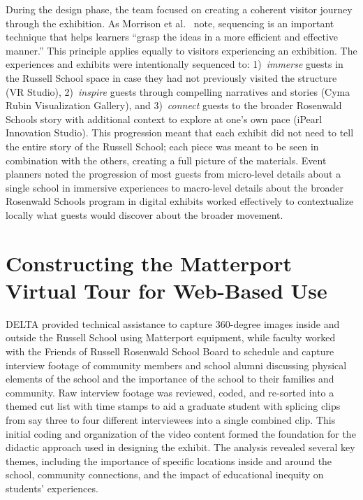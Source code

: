 \documentclass[final]{anthology-ch}  %
\begin{document}
During the design phase, the team focused on creating a coherent visitor journey through the exhibition. As Morrison et al.\ \cite[p.~17]{morrison2019designing} note, sequencing is an important technique that helps learners \enquote{grasp the ideas in a more efficient and effective manner.} This principle applies equally to visitors experiencing an exhibition. The experiences and exhibits were intentionally sequenced to: 1)~\textit{immerse} guests in the Russell School space in case they had not previously visited the structure (VR Studio), 2)~\textit{inspire} guests through compelling narratives and stories (Cyma Rubin Visualization Gallery), and 3)~\textit{connect} guests to the broader Rosenwald Schools story with additional context to explore at one's own pace (iPearl Innovation Studio). This progression meant that each exhibit did not need to tell the entire story of the Russell School; each piece was meant to be seen in combination with the others, creating a full picture of the materials. Event planners noted the progression of most guests from micro-level details about a single school in immersive experiences to macro-level details about the broader Rosenwald Schools program in digital exhibits worked effectively to contextualize locally what guests would discover about the broader movement.

\section{Constructing the Matterport Virtual Tour for Web-Based Use}

DELTA provided technical assistance to capture 360-degree images inside and outside the Russell School using Matterport equipment, while faculty worked with the Friends of Russell Rosenwald School Board to schedule and capture interview footage of community members and school alumni discussing physical elements of the school and the importance of the school to their families and community. Raw interview footage was reviewed, coded, and re-sorted into a themed cut list with time stamps to aid a graduate student with splicing clips from say three to four different interviewees into a single combined clip. This initial coding and organization of the video content formed the foundation for the didactic approach used in designing the exhibit. The analysis revealed several key themes, including the importance of specific locations inside and around the school, community connections, and the impact of educational inequity on students' experiences.
\end{document}
